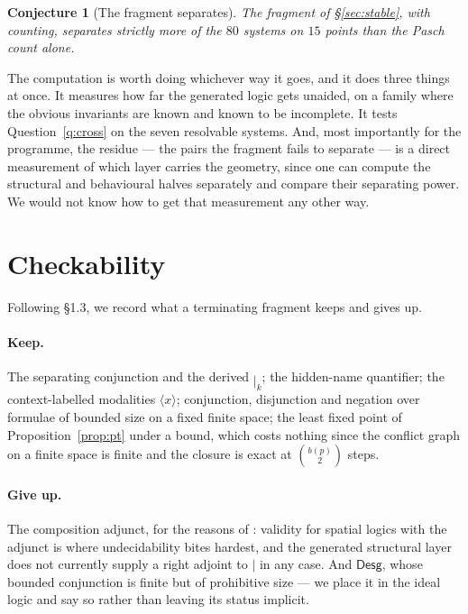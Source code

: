 \documentclass[11pt]{article}
\theoremstyle{plain}
\newtheorem{conjecture}[theorem]{Conjecture}
\theoremstyle{definition}
\newcommand{\bmid}{\mathbin{|}}
\newcommand{\Desg}{\mathsf{Desg}}
\begin{document}
\begin{conjecture}[The fragment separates]
\label{conj:sts}
The fragment of \S\ref{sec:stable}, with counting, separates strictly more of the $80$ systems on
$15$ points than the Pasch count alone.
\end{conjecture}

The computation is worth doing whichever way it goes, and it does three things at once. It measures
how far the generated logic gets unaided, on a family where the obvious invariants are known and
known to be incomplete. It tests Question~\ref{q:cross} on the seven resolvable systems. And, most
importantly for the programme, the residue --- the pairs the fragment fails to separate --- is a
direct measurement of which layer carries the geometry, since one can compute the structural and
behavioural halves separately and compare their separating power. We would not know how to get that
measurement any other way.

\section{Checkability}
\label{sec:check}

Following \S1.3, we record what a terminating fragment keeps and gives up.

\paragraph{Keep.} The separating conjunction and the derived $\bmid_k$; the hidden-name quantifier;
the context-labelled modalities $\langle x \rangle$; conjunction, disjunction and negation over
formulae of bounded size on a fixed finite space; the least fixed point of Proposition~\ref{prop:pt}
under a bound, which costs nothing since the conflict graph on a finite space is finite and the
closure is exact at $\binom{b(p)}{2}$ steps.

\paragraph{Give up.} The composition adjunct, for the reasons of \cite[\S6]{Classifier}: validity
for spatial logics with the adjunct is where undecidability bites hardest, and the generated
structural layer does not currently supply a right adjoint to $|$ in any case. And $\Desg$, whose
bounded conjunction is finite but of prohibitive size --- we place it in the ideal logic and say so
rather than leaving its status implicit.
\end{document}
